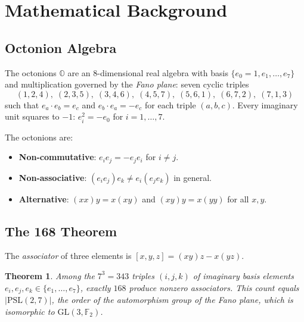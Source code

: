 \documentclass{article}
\newtheorem{theorem}{Theorem}
\newcommand{\Oct}{\mathbb{O}}
\newcommand{\assoc}[3]{[#1,#2,#3]}
\begin{document}
\section{Mathematical Background}
\label{sec:math}

\subsection{Octonion Algebra}
\label{sec:oct}

The octonions $\Oct$ are an 8-dimensional real algebra with basis $\{e_0 = 1, e_1, \ldots, e_7\}$ and multiplication governed by the \emph{Fano plane}: seven cyclic triples
\begin{equation}
(1,2,4),\; (2,3,5),\; (3,4,6),\; (4,5,7),\; (5,6,1),\; (6,7,2),\; (7,1,3)
\end{equation}
such that $e_a \cdot e_b = e_c$ and $e_b \cdot e_a = -e_c$ for each triple $(a,b,c)$.
Every imaginary unit squares to $-1$: $e_i^2 = -e_0$ for $i = 1,\ldots,7$.

The octonions are:
\begin{itemize}
    \item \textbf{Non-commutative}: $e_i e_j = -e_j e_i$ for $i \neq j$.
    \item \textbf{Non-associative}: $(e_i e_j) e_k \neq e_i (e_j e_k)$ in general.
    \item \textbf{Alternative}: $(x x) y = x (x y)$ and $(x y) y = x (y y)$ for all $x, y$.
\end{itemize}

\subsection{The 168 Theorem}
\label{sec:168}

The \emph{associator} of three elements is $\assoc{x}{y}{z} = (xy)z - x(yz)$.

\begin{theorem}
Among the $7^3 = 343$ triples $(i,j,k)$ of imaginary basis elements $e_i, e_j, e_k \in \{e_1, \ldots, e_7\}$, exactly $168$ produce nonzero associators. This count equals $|\mathrm{PSL}(2,7)|$, the order of the automorphism group of the Fano plane, which is isomorphic to $\mathrm{GL}(3, \mathbb{F}_2)$.
\end{theorem}
\end{document}
